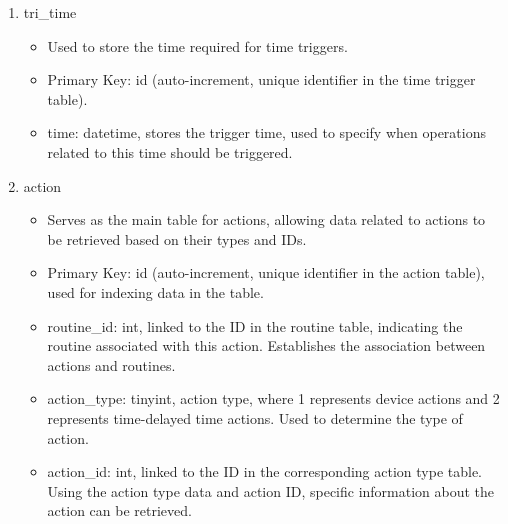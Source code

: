 \begin{enumerate}
\begin{enumerate}
                        \item tri\_time
                              \begin{itemize}
                                  \item Used to store the time required for time triggers.
                                  \item Primary Key: id (auto-increment, unique identifier in the time trigger table).
                                  \item time: datetime, stores the trigger time, used to specify when operations related to this time should be triggered.\\
                              \end{itemize}

                        \item action
                              \begin{itemize}
                                  \item Serves as the main table for actions, allowing data related to actions to be retrieved based on their types and IDs.
                                  \item Primary Key: id (auto-increment, unique identifier in the action table), used for indexing data in the table.
                                  \item routine\_id: int, linked to the ID in the routine table, indicating the routine associated with this action. Establishes the association between actions and routines.
                                  \item action\_type: tinyint, action type, where 1 represents device actions and 2 represents time-delayed time actions. Used to determine the type of action.
                                  \item action\_id: int, linked to the ID in the corresponding action type table. Using the action type data and action ID, specific information about the action can be retrieved.\\
                              \end{itemize}


\end{enumerate}
\end{enumerate}
